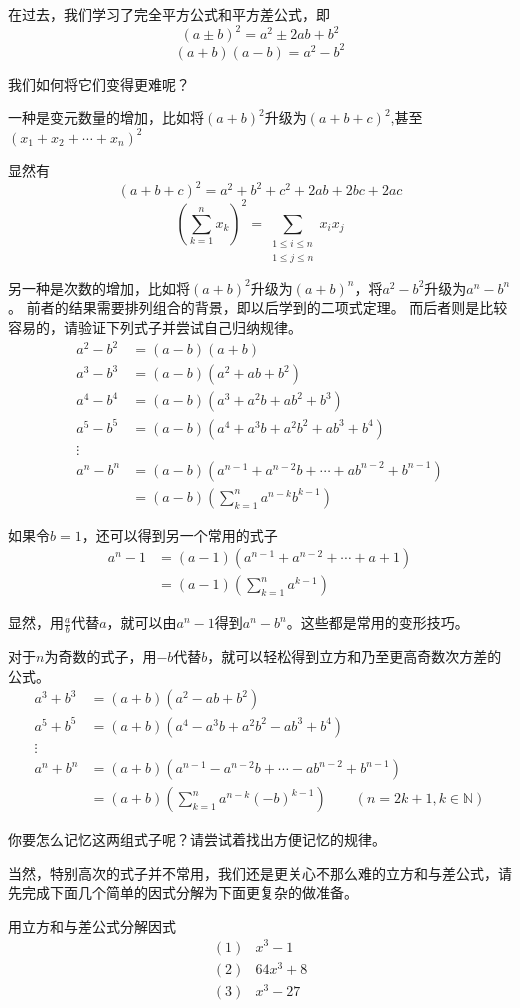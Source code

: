 在过去，我们学习了完全平方公式和平方差公式，即
\[(a\pm b)^2=a^2\pm 2ab +b^2\]
\[(a+b)(a-b)=a^2-b^2\]

我们如何将它们变得更难呢？

一种是变元数量的增加，比如将$(a+b)^2$升级为$(a+b+c)^2$,甚至$(x_1+x_2+\cdots +x_n)^2$

显然有\[(a+b+c)^2=a^2+b^2+c^2+2ab+2bc+2ac\]
\[(\sum_{k= 1}^{n}x_k  )^2=\sum_{\substack{1\leq i\leq n\\1\leq j\leq n}}x_ix_j\]

另一种是次数的增加，比如将$(a+b)^2$升级为$(a+b)^n$，将$a^2-b^2$升级为$a^n-b^n$。
前者的结果需要排列组合的背景，即以后学到的二项式定理。
而后者则是比较容易的，请验证下列式子并尝试自己归纳规律。
\begin{align*}
    a^2-b^2&=(a-b)(a+b)\\
    a^3-b^3&=(a-b)(a^2+ab+b^2)\\
    a^4-b^4&=(a-b)(a^3+a^2b+ab^2+b^3)\\
    a^5-b^5&=(a-b)(a^4+a^3b+a^2b^2+ab^3+b^4)\\
    \vdots  \\
    a^n-b^n&=(a-b)(a^{n-1}+a^{n-2}b+\cdots +ab^{n-2}+b^{n-1})\\
           &=(a-b)(\sum_{k=1}^{n}a^{n-k}b^{k-1})
\end{align*}

如果令$b=1$，还可以得到另一个常用的式子
\begin{align*}
     a^n-1&=(a-1)(a^{n-1}+a^{n-2}+\cdots +a+1)\\
           &=(a-1)(\sum_{k=1}^{n}a^{k-1})
\end{align*}
     
显然，用$\frac{a}{b}$代替$a$，就可以由$a^n-1$得到$a^n-b^n$。这些都是常用的变形技巧。

对于$n$为奇数的式子，用$-b$代替$b$，就可以轻松得到立方和乃至更高奇数次方差的公式。
\begin{align*}
a^3+b^3&=(a+b)(a^2-ab+b^2)\\
a^5+b^5&=(a+b)(a^4-a^3b+a^2b^2-ab^3+b^4)\\
\vdots \\
a^n+b^n&=(a+b)(a^{n-1}-a^{n-2}b+\cdots -ab^{n-2}+b^{n-1})\\
       &=(a+b)(\sum_{k=1}^{n}a^{n-k}(-b)^{k-1})\qquad(n=2k+1,k\in \mathbb{N} )
\end{align*}

你要怎么记忆这两组式子呢？请尝试着找出方便记忆的规律。

当然，特别高次的式子并不常用，我们还是更关心不那么难的立方和与差公式，请先完成下面几个简单的因式分解为下面更复杂的做准备。
\begin{exercise}
    用立方和与差公式分解因式
    \begin{align*}
        (1)&x^3-1\\
        (2)&64x^3+8\\
        (3)&x^3-27
    \end{align*}
\end{exercise}

